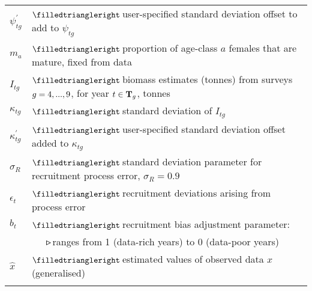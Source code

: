 \documentclass[11pt]{book}
\newcommand{\mbull}{$\filledtriangleright$\,}
\newcommand{\nbull}{~~~$\smalltriangleright$\,}
\begin{document}
\begin{longtable}{L{1.00in}L{5.5in}}
$\psi_{tg}^\prime$    & \mbull user-specified standard deviation offset to add to $\psi_{tg}$\\
$m_a$                 & \mbull proportion of age-class $a$ females that are mature, fixed from data\\
$I_{tg}$              & \mbull biomass estimates (tonnes) from surveys $g = 4,...,9$, for year $t \in {\bf T}_g$, tonnes\\
$\kappa_{tg}$         & \mbull standard deviation of $I_{tg}$\\
$\kappa_{tg}^\prime$  & \mbull user-specified standard deviation offset added to $\kappa_{tg}$\\
$\sigma_R$            & \mbull standard deviation parameter for recruitment process error, $\sigma_R = 0.9$\\
$\epsilon_t$          & \mbull recruitment deviations arising from process error\\
$b_t$                 & \mbull recruitment bias adjustment parameter:\\
                      & \nbull ranges from 1 (data-rich years) to 0 (data-poor years)\\
$\widehat{x}$       & \mbull estimated values of observed data $x$ (generalised)\\
\\[-.5ex]


\end{longtable}
\end{document}
